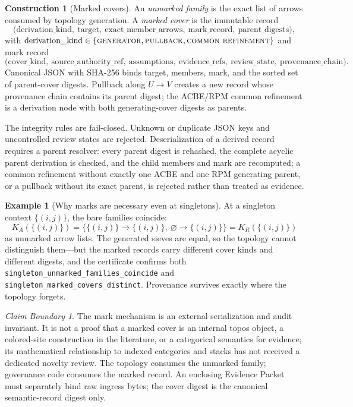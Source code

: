 \documentclass[11pt]{amsart}
\theoremstyle{definition}
\newtheorem{construction}[theorem]{Construction}
\newtheorem{example}[theorem]{Example}
\theoremstyle{remark}
\newtheorem{boundary}[theorem]{Claim Boundary}
\begin{document}
\begin{construction}[Marked covers]\label{con:marks}
An \emph{unmarked family} is the exact list of arrows consumed by topology generation. A \emph{marked cover} is the immutable record
\[
\bigl(\text{derivation\_kind},\ \text{target},\ \text{exact\_member\_arrows},\ \text{mark\_record},\ \text{parent\_digests}\bigr),
\]
with $\text{derivation\_kind}\in\{\textsc{generator},\textsc{pullback},\textsc{common refinement}\}$ and mark record
\[
\bigl(\text{cover\_kind},\ \text{source\_authority\_ref},\ \text{assumptions},\ \text{evidence\_refs},\ \text{review\_state},\ \text{provenance\_chain}\bigr).
\]
Canonical JSON with SHA-256 binds target, members, mark, and the sorted set of parent-cover digests. Pullback along $U\to V$ creates a new record whose provenance chain contains its parent digest; the ACBE/RPM common refinement is a derivation node with both generating-cover digests as parents.
\end{construction}

The integrity rules are fail-closed. Unknown or duplicate JSON keys and uncontrolled review states are rejected. Deserialization of a derived record requires a parent resolver: every parent digest is rehashed, the complete acyclic parent derivation is checked, and the child members and mark are recomputed; a common refinement without exactly one ACBE and one RPM generating parent, or a pullback without its exact parent, is rejected rather than treated as evidence.

\begin{example}[Why marks are necessary even at singletons]\label{ex:singleton}
At a singleton context $\{(i,j)\}$, the bare families coincide:
\[
K_A(\{(i,j)\})=\{\{(i,j)\}\to\{(i,j)\},\ \varnothing\to\{(i,j)\}\}=K_R(\{(i,j)\})
\]
as unmarked arrow lists. The generated sieves are equal, so the topology cannot distinguish them---but the marked records carry different cover kinds and different digests, and the certificate confirms both \texttt{singleton\_unmarked\_families\_coincide} and \texttt{singleton\_marked\_covers\_distinct}. Provenance survives exactly where the topology forgets.
\end{example}

\begin{boundary}
The mark mechanism is an external serialization and audit invariant. It is not a proof that a marked cover is an internal topos object, a colored-site construction in the literature, or a categorical semantics for evidence; its mathematical relationship to indexed categories and stacks has not received a dedicated novelty review. The topology consumes the unmarked family; governance code consumes the marked record. An enclosing Evidence Packet must separately bind raw ingress bytes; the cover digest is the canonical semantic-record digest only.
\end{boundary}
\end{document}
